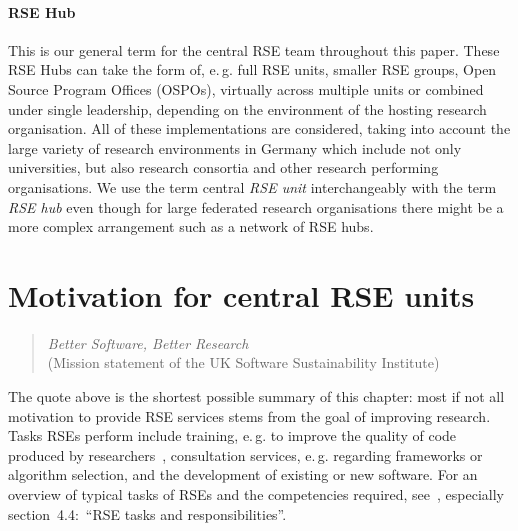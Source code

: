 \documentclass[a4paper]{article}
\makeatletter
\newcommand*{\eg}{e.\,g.\@\xspace}
\makeatother
\begin{document}
\paragraph{RSE Hub}
This is our general term for the central RSE team throughout this paper.
These RSE Hubs can take the form of, \eg{} full RSE units, smaller RSE groups, Open Source Program Offices (OSPOs), virtually across multiple units or combined under single leadership,
 depending on the environment of the hosting research organisation.
All of these implementations are considered, taking into account the large variety of research environments in Germany which include not only universities, but also research consortia and other research performing organisations.
We use the term central \emph{RSE unit} interchangeably with the term \emph{RSE hub} even though for large federated research organisations there might be a more complex arrangement such as a network of RSE hubs.

\section{Motivation for central RSE units}
\begin{quotation}
      \textit{Better Software, Better Research}\\(Mission statement of the UK Software Sustainability Institute)
\end{quotation}

The quote above is the shortest possible summary of this chapter: most if not all motivation to provide RSE services stems from the goal of improving research.
Tasks RSEs perform include training, \eg{} to improve the quality of code produced by researchers~\autocite{Ostlund2023}, consultation services, \eg{} regarding frameworks or algorithm selection, and the development of existing or new software.
For an overview of typical tasks of RSEs and the competencies required, see~\autocite{goth_foundational_competencies_2024}, especially section\ 4.4:\ “RSE tasks and responsibilities”.
\end{document}
